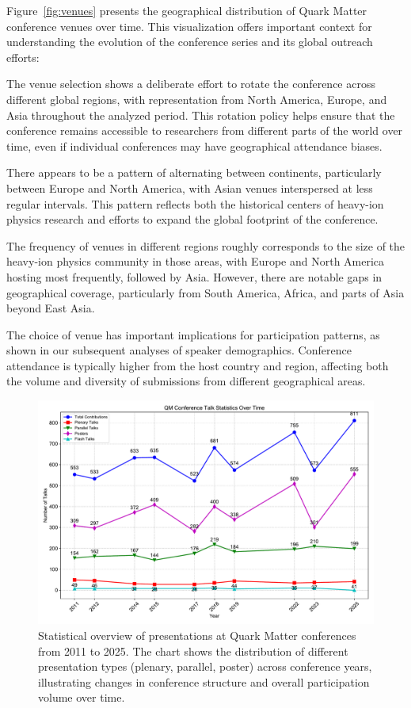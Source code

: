 \documentclass[a4paper,11pt]{article}
\begin{document}
Figure~\ref{fig:venues} presents the geographical distribution of Quark Matter conference venues over time. This visualization offers important context for understanding the evolution of the conference series and its global outreach efforts:

The venue selection shows a deliberate effort to rotate the conference across different global regions, with representation from North America, Europe, and Asia throughout the analyzed period. This rotation policy helps ensure that the conference remains accessible to researchers from different parts of the world over time, even if individual conferences may have geographical attendance biases.

There appears to be a pattern of alternating between continents, particularly between Europe and North America, with Asian venues interspersed at less regular intervals. This pattern reflects both the historical centers of heavy-ion physics research and efforts to expand the global footprint of the conference.

The frequency of venues in different regions roughly corresponds to the size of the heavy-ion physics community in those areas, with Europe and North America hosting most frequently, followed by Asia. However, there are notable gaps in geographical coverage, particularly from South America, Africa, and parts of Asia beyond East Asia.

The choice of venue has important implications for participation patterns, as shown in our subsequent analyses of speaker demographics. Conference attendance is typically higher from the host country and region, affecting both the volume and diversity of submissions from different geographical areas.

\begin{figure}[H]
\centering
\includegraphics[width=\textwidth]{figures/QM_talk_statistics.pdf}
\caption{Statistical overview of presentations at Quark Matter conferences from 2011 to 2025. The chart shows the distribution of different presentation types (plenary, parallel, poster) across conference years, illustrating changes in conference structure and overall participation volume over time.}
\label{fig:talk_statistics}
\end{figure}
\end{document}
